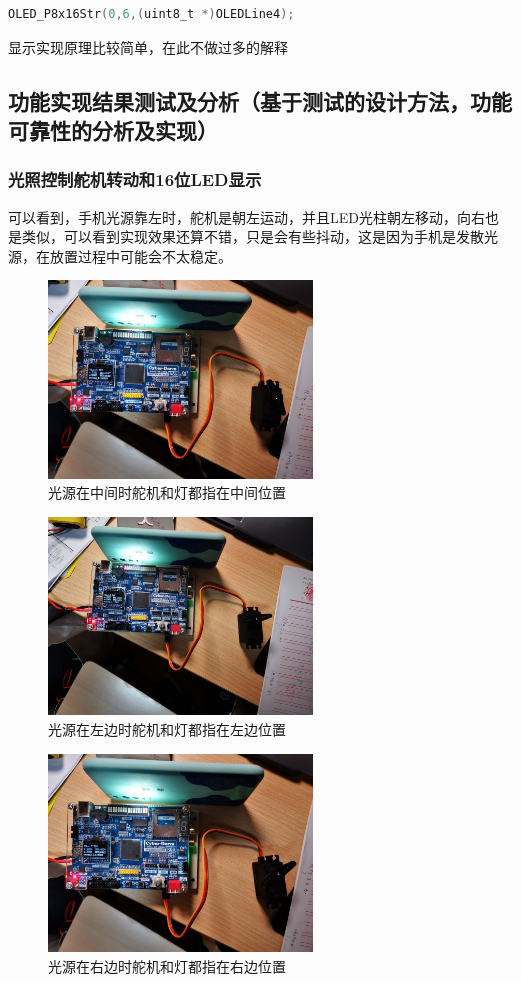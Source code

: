 {\begin{lstlisting}[language = C]
OLED_P8x16Str(0,6,(uint8_t *)OLEDLine4);
\end{lstlisting}

\par{显示实现原理比较简单，在此不做过多的解释}

\subsection{功能实现结果测试及分析（基于测试的设计方法，功能可靠性的分析及实现）}
\subsubsection{光照控制舵机转动和16位LED显示}
\par{可以看到，手机光源靠左时，舵机是朝左运动，并且LED光柱朝左移动，向右也是类似，可以看到实现效果还算不错，只是会有些抖动，这是因为手机是发散光源，在放置过程中可能会不太稳定。}

\begin{figure}[H]
\centering
\includegraphics[width=7cm]{figure/3.1.1.jpg}
\caption{光源在中间时舵机和灯都指在中间位置} \label{fig:3.1.1}
\end{figure}
\begin{figure}[H]
\centering
\includegraphics[width=7cm]{figure/3.1.2.jpg}
\caption{光源在左边时舵机和灯都指在左边位置} \label{fig:3.1.2}
\end{figure}
\begin{figure}[H]
\centering
\includegraphics[width=7cm]{figure/3.1.3.jpg}
\caption{光源在右边时舵机和灯都指在右边位置} \label{fig:3.1.3}
\end{figure}

}
